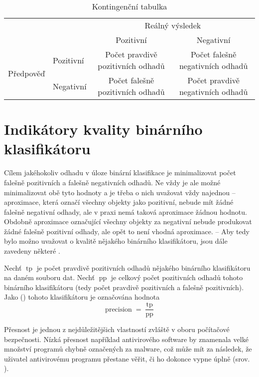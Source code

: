 \begin{table}[h]
	\caption{Kontingenční tabulka}\label{contingency_table}
	\centering
	\begin{tabular}{llcc}
		\toprule
		&& \multicolumn{2}{c}{Reálný výsledek} \\
		\cmidrule(l){3-4}
		&& Pozitivní & Negativní \\
		\cmidrule{3-4}
		\multirow{2}{*}{Předpověď} & \multicolumn{1}{l|}{Pozitivní} & Počet pravdivě pozitivních odhadů & Počet falešně negativních odhadů \\
		& \multicolumn{1}{l|}{Negativní} & Počet falešně pozitivních odhadů & Počet pravdivě negativních odhadů \\
		\bottomrule
	\end{tabular}
\end{table}

\section{Indikátory kvality binárního klasifikátoru}\label{quality_indicators}
Cílem jakéhokoliv odhadu v úloze binární klasifikace je minimalizovat počet falešně pozitivních a falešně negativních odhadů. Ne vždy je ale možné minimalizovat obě tyto hodnoty a je třeba o nich uvažovat vždy najednou -- aproximace, která označí všechny objekty jako pozitivní, nebude mít žádné falešně negativní odhady, ale v praxi nemá taková aproximace žádnou hodnotu. Obdobně aproximace označující všechny objekty za negativní nebude produkovat žádné falešně pozitivní odhady, ale opět to není vhodná aproximace. -- Aby tedy bylo možno uvažovat o kvalitě nějakého binárního klasifikátoru, jsou dále zavedeny některé .

\begin{define}
	Nechť \( \operatorname{tp} \) je počet pravdivě pozitivních odhadů nějakého binárního klasifikátoru na daném souboru dat. Nechť \( \operatorname{pp} \) je celkový počet pozitivních odhadů tohoto binárního klasifikátoru (tedy počet pravdivě pozitivních a falešně pozitivních). Jako  () tohoto klasifikátoru je označována hodnota
	\[ \operatorname{precision} = \frac{\operatorname{tp}}{\operatorname{pp}} \]
\end{define}

Přesnost je jednou z nejdůležitějšich vlastností zvláště v oboru počítačové bezpečnosti. Nízká přesnost například antivirového software by znamenala velké množství programů chybně označených za malware, což může mít za následek, že uživatel antivirovému programu přestane věřit, či ho dokonce vypne úplně (srov. \cite{vejmelka_fighting_2017}).


